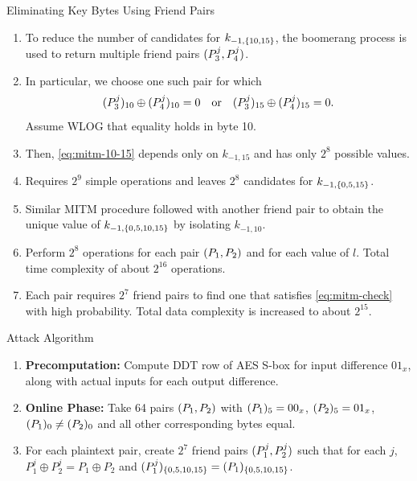 \documentclass[notheorems]{beamer}
\theoremstyle{definition}
\theoremstyle{example}
\begin{document}
    \begin{frame}[<+->]{Eliminating Key Bytes Using Friend Pairs}
        \begin{enumerate}
            \item To reduce the number of candidates for \(k_{-1, \{10,
            15\}}\), the boomerang process is used to return multiple friend
            pairs \((P_3^j, P_4^j)\).
            \item In particular, we choose one such pair for which
            \begin{equation}
                (P_3^j)_{10} \oplus (P_4^j)_{10} = 0 \quad \textrm{or} \quad (P_3^j)_{15} \oplus (P_4^j)_{15} = 0.
                \label{eq:mitm-check}
            \end{equation}
            Assume WLOG that equality holds in byte 10.
            \item Then, \eqref{eq:mitm-10-15} depends only on \(k_{-1, 15}\) and
            has only \(2^8\) possible values.
            \item Requires \(2^9\) simple operations and leaves \(2^8\)
            candidates for \(k_{-1, \{0, 5, 15\}}\).
            \item Similar MITM procedure followed with another friend pair to
            obtain the unique value of \(k_{-1, \{0, 5, 10, 15\}}\) by
            isolating \(k_{-1, 10}\).
            \item Perform \(2^8\) operations for each pair \((P_1, P_2)\)
            and for each value of \(l\). Total time complexity of about
            \(2^{16}\) operations.
            \item Each pair requires \(2^7\) friend pairs to find one that
            satisfies \eqref{eq:mitm-check} with high probability. Total data
            complexity is increased to about \(2^{15}\).
        \end{enumerate} 
    \end{frame}

    \begin{frame}[<+->]{Attack Algorithm}
        \begin{enumerate}
            \item \textbf{Precomputation:} Compute DDT row of AES S-box for
            input difference \(01_x\), along with actual inputs for each output
            difference.
            \item \textbf{Online Phase:} Take 64 pairs \((P_1, P_2)\) with
            \((P_1)_5 = 00_x\), \((P_2)_5 = 01_x\), \((P_1)_0 \ne
            (P_2)_0\) and all other corresponding bytes equal.
            \item For each plaintext pair, create \(2^7\) friend pairs
            \((P_1^j, P_2^j)\) such that for each \(j\), \(P_1^j \oplus
            P_2^j = P_1 \oplus P_2\) and \((P_1^j)_{\{0, 5, 10, 15\}} =
            (P_1)_{\{0, 5, 10, 15\}}\).
            \seti
        \end{enumerate}
    \end{frame}
\end{document}
